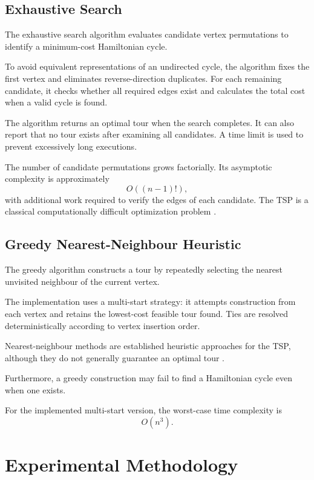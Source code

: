 \documentclass[english,times,final,mirror,longpaper]{revdetua}
\begin{document}
\subsection{Exhaustive Search}

The exhaustive search algorithm evaluates candidate vertex
permutations to identify a minimum-cost Hamiltonian cycle.

To avoid equivalent representations of an undirected cycle, the
algorithm fixes the first vertex and eliminates reverse-direction
duplicates. For each remaining candidate, it checks whether all
required edges exist and calculates the total cost when a valid cycle
is found.

The algorithm returns an optimal tour when the search completes.
It can also report that no tour exists after examining all candidates.
A time limit is used to prevent excessively long executions.

The number of candidate permutations grows factorially. Its
asymptotic complexity is approximately
\[
O((n-1)!),
\]
with additional work required to verify the edges of each candidate.
The TSP is a classical computationally difficult optimization problem
\cite{garey1979}.

\subsection{Greedy Nearest-Neighbour Heuristic}

The greedy algorithm constructs a tour by repeatedly selecting the
nearest unvisited neighbour of the current vertex.

The implementation uses a multi-start strategy: it attempts
construction from each vertex and retains the lowest-cost feasible
tour found. Ties are resolved deterministically according to vertex
insertion order.

Nearest-neighbour methods are established heuristic approaches
for the TSP, although they do not generally guarantee an optimal
tour \cite{rosenkrantz1977}.

Furthermore, a greedy construction may fail to find a Hamiltonian
cycle even when one exists.

For the implemented multi-start version, the worst-case time
complexity is
\[
O(n^3).
\]

\section{Experimental Methodology}
\end{document}
